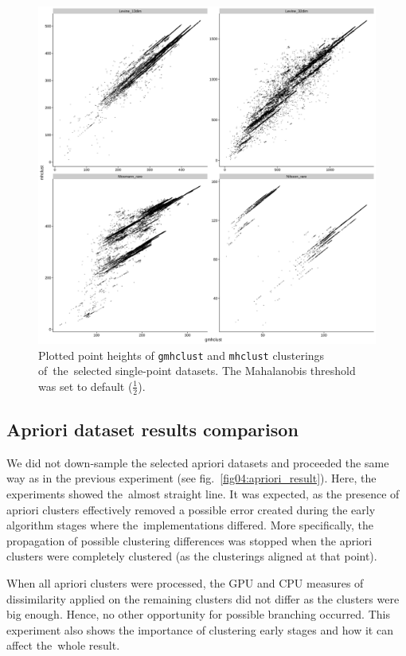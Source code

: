 \begin{figure}\centering
	\includegraphics[width=\linewidth]{img/single_result}
	\caption{Plotted point heights of \texttt{gmhclust} and \texttt{mhclust} clusterings of~the~selected single-point datasets. The Mahalanobis threshold was set to default ($\frac{1}{2}$).}
	\label{fig04:single_result}
\end{figure}

\subsection{Apriori dataset results comparison}

We did not down-sample the selected apriori datasets and proceeded the same way as in the previous experiment (see fig.~\ref{fig04:apriori_result}). Here, the experiments showed the~almost straight line. It was expected, as the presence of apriori clusters effectively removed a possible error created during the early algorithm stages where the~implementations differed. More specifically, the propagation of possible clustering differences was stopped when the apriori clusters were completely clustered (as the clusterings aligned at that point).

When all apriori clusters were processed, the GPU and CPU measures of dissimilarity applied on the remaining clusters did not differ as the clusters were big enough. Hence, no other opportunity for possible branching occurred. This experiment also shows the importance of clustering early stages and how it can affect the~whole result.

